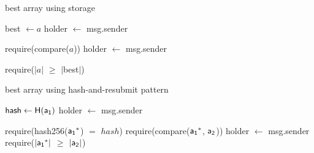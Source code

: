 \begin{algorithm}
    \label{alg:compare-storage}
    \caption{\textsf{best array} using storage}
    \begin{algorithmic}[1]

        \EndFunction
        \State \textsf{best} $\gets a$
            \State \textsf{holder $\gets$ msg.sender}
        \EndFunction

            \State \textsf{require}(\textsf{compare}($a$))
            \State \textsf{holder} $\gets$ \textsf{msg.sender}
        \EndFunction

            \State \textsf{require}($|a|$ $\geq$ $|$\textsf{best}$|$)
             
                \EndIf
            \EndFor
            \State {}
        \EndFunction
        \EndContract
        \vskip8pt
    \end{algorithmic}
\end{algorithm}

\begin{algorithm}
    \label{alg:compare-memory}
    \caption{\textsf{best array} using hash-and-resubmit pattern}
    \begin{algorithmic}[1]
        \EndFunction
        \State $\textsf{hash} \gets \textsf{H}(\mathsf{a_1})$
            \State \textsf{holder} $\gets$ \textsf{msg.sender}
        \EndFunction

    \State \textsf{require}(\textsf{hash256}($\mathsf{a_1}^*$) $=$ $hash$)
        \State \textsf{require}(\textsf{compare}($\mathsf{a_1}^*$, $\mathsf{a_2}$))
        \State \textsf{holder} $\gets$ \textsf{msg.sender}
    \EndFunction
        \State \textsf{require}($|\mathsf{a_1}^*|$ $\geq$ $|\mathsf{a_2}|$)
        \If{$\arra^*[i] \leq \arrb[i]$} 
            \EndIf
        \EndFor
    \EndFunction
    \State {}
    \EndContract
    \vskip8pt
    \end{algorithmic}
\end{algorithm}
